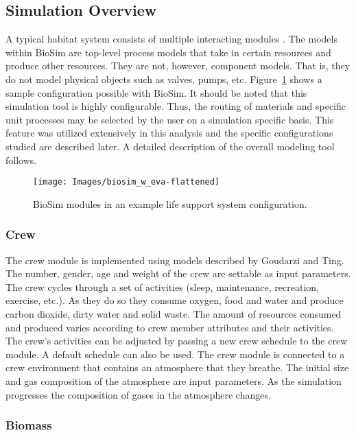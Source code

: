 \documentclass[submit]{aiaa}
\begin{document}
\subsection{Simulation Overview}
\label{sec:sim_overview}

A typical habitat system consists of multiple interacting modules \cite{alss_reqs03}.
The models within BioSim are top-level process models that take in certain resources and produce other resources.
They are not, however, component models. 
That is, they do not model physical objects such
as valves, pumps, etc.  Figure~\ref{fig:biosim} shows a sample configuration possible with BioSim.
It should be noted that this simulation tool is highly configurable.
Thus, the routing of materials and specific unit processes may be selected by the user on a simulation specific basis.
This feature was utilized extensively in this analysis and the specific configurations studied are described later.
A detailed description of the overall modeling tool follows.

\begin{figure}[htb]
\texttt{[image: Images/biosim\_w\_eva-flattened]}
\caption{BioSim modules in an example life support system configuration.}
\label{fig:biosim}
\end{figure}

\subsubsection{Crew}

The crew module is implemented using models described by Goudarzi and
Ting\cite{goudarzi_ting99}.  The number, gender, age and weight of the
crew are settable as input parameters.  The crew cycles through a set
of activities (sleep, maintenance, recreation, exercise, etc.).  As they do so
they consume oxygen, food and water and produce carbon dioxide,
dirty water and solid waste.  The amount of resources consumed and
produced varies according to crew member attributes and their
activities.  The crew's activities can be adjusted by passing a new
crew schedule to the crew module.  A default schedule can also be
used.  The crew module is connected to a crew environment that
contains an atmosphere that they breathe.  The initial size and gas
composition of the atmosphere are input parameters.  As the simulation
progresses the composition of gases in the atmosphere changes.

\subsubsection{Biomass}
\end{document}
